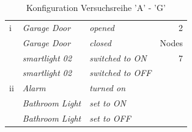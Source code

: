 \begin{table}[]
{\begin{tabular}{llll}
i             & \textit{Garage Door}          & \textit{opened}                           & \multicolumn{1}{r}{2}     \\
              & \textit{Garage Door}          & \textit{closed}                           & Nodes                     \\
              & \textit{smartlight 02}        & \textit{switched to ON}                   & \multicolumn{1}{r}{7}     \\
              & \textit{smartlight 02}        & \textit{switched to OFF}                  &                           \\
ii            & \textit{Alarm}                & \textit{turned on}                        &                           \\
              & \textit{Bathroom Light}       & \textit{set to ON}                        &                           \\
              & \textit{Bathroom Light}       & \textit{set to OFF}                       &                           \\ \hline

\end{tabular}%
}
\caption{Konfiguration Versuchsreihe 'A' - 'G'}
\label{tab:Versuchskonfig1}
\end{table}

